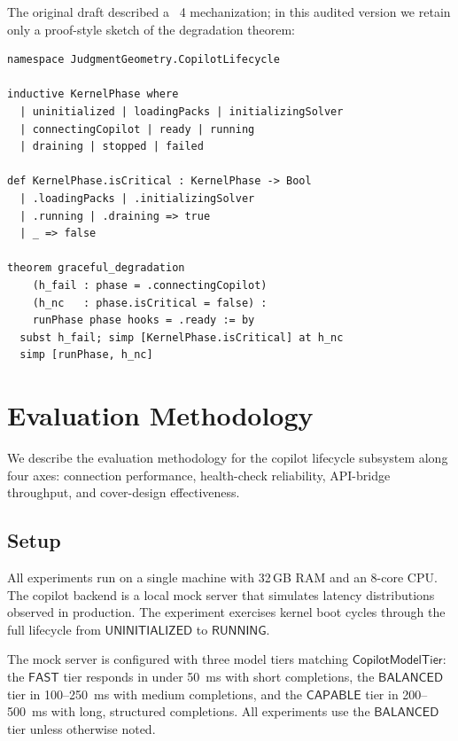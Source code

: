 \documentclass[11pt]{article}
\newcommand{\CMT}{\mathsf{CopilotModelTier}}
\newcommand{\FAST}{\mathsf{FAST}}
\newcommand{\BALANCED}{\mathsf{BALANCED}}
\newcommand{\CAPABLE}{\mathsf{CAPABLE}}
\newcommand{\UNINIT}{\mathsf{UNINITIALIZED}}
\newcommand{\RUNNING}{\mathsf{RUNNING}}
\begin{document}
The original draft described a \LEAN~4 mechanization; in this audited
version we retain only a proof-style sketch of the degradation theorem:

\begin{lstlisting}[language=lean, basicstyle=\ttfamily\small,
  caption={Lean~4 proof sketch of graceful degradation.}]
namespace JudgmentGeometry.CopilotLifecycle

inductive KernelPhase where
  | uninitialized | loadingPacks | initializingSolver
  | connectingCopilot | ready | running
  | draining | stopped | failed

def KernelPhase.isCritical : KernelPhase -> Bool
  | .loadingPacks | .initializingSolver
  | .running | .draining => true
  | _ => false

theorem graceful_degradation
    (h_fail : phase = .connectingCopilot)
    (h_nc   : phase.isCritical = false) :
    runPhase phase hooks = .ready := by
  subst h_fail; simp [KernelPhase.isCritical] at h_nc
  simp [runPhase, h_nc]
\end{lstlisting}

\section{Evaluation Methodology}\label{sec:experiments}

We describe the evaluation methodology for the copilot lifecycle
subsystem along four axes: connection performance, health-check
reliability, API-bridge throughput, and cover-design effectiveness.

\subsection{Setup}

All experiments run on a single machine with 32\,GB RAM and an
8-core CPU.  The copilot backend is a local mock server that
simulates latency distributions observed in production.  The
experiment exercises kernel boot cycles through the
full lifecycle from $\UNINIT$ to $\RUNNING$.

The mock server is configured with three model tiers matching
$\CMT$: the $\FAST$ tier responds in under 50~ms with
short completions, the $\BALANCED$ tier in 100--250~ms with
medium completions, and the $\CAPABLE$ tier in 200--500~ms with
long, structured completions.  All experiments use the $\BALANCED$
tier unless otherwise noted.
\end{document}
